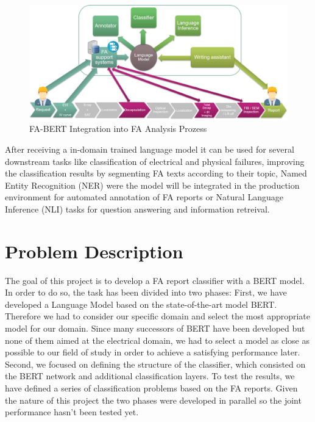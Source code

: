 \begin{figure}[H]
	\centering	\includegraphics[width=1\textwidth]{figures/fa_bert_process.png}
	\caption{FA-BERT Integration into FA Analysis Prozess}
	\label{fig:fa_bert_process}
\end{figure}

After receiving a in-domain trained language model it can be used for several downstream tasks like classification of electrical and physical failures, improving the classification results by segmenting FA texts according to their topic, Named Entity Recognition (NER) were the model will be integrated in the production environment for automated annotation of FA reports or Natural Language Inference (NLI) tasks for question answering and information retreival.

\section{Problem Description}
The goal of this project is to develop a FA report classifier with a BERT model.
In order to do so, the task has been divided into two phases: \newline
First, we have developed a Language Model based on the state-of-the-art model BERT. Therefore we had to consider our specific domain and select the most appropriate model for our domain. Since many successors of BERT have been developed but none of them aimed at the electrical domain, we had to select a model as close as possible to our field of study in order to achieve a satisfying performance later. \newline
Second, we focused on defining the structure of the classifier, which consisted on the BERT network and additional classification layers. To test the results, we have defined a series of classification problems based on the FA reports. \newline
Given the nature of this project the two phases were developed in parallel so the joint performance hasn't been tested yet. \newline

